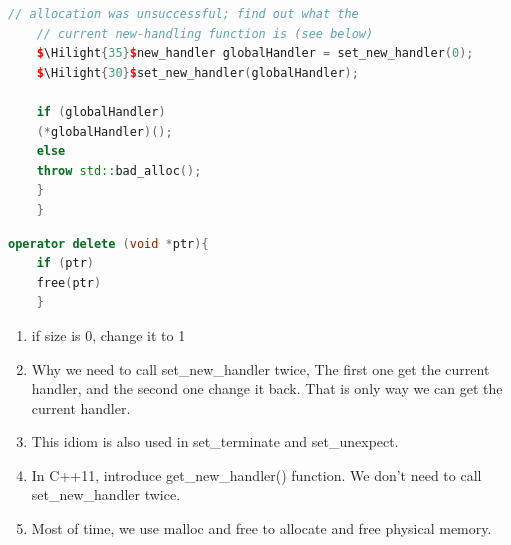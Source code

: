 \documentclass[a4paper,11pt,twoside]{book}
\newcommand{\Hilight}[1]{\makebox[0pt][l]{\color{yellow}\rule[-3pt]{#1em}{11pt}}}
\newcommand{\Hilight}[1]{}
\begin{document}
\begin{itemize}
\begin{lstlisting}[frame=single, language=c++]
	// allocation was unsuccessful; find out what the
	// current new-handling function is (see below)
	$\Hilight{35}$new_handler globalHandler = set_new_handler(0);
	$\Hilight{30}$set_new_handler(globalHandler);
	
	if (globalHandler) 
	(*globalHandler)();
	else 
	throw std::bad_alloc();
	}
	}
	\end{lstlisting}
	
	\begin{lstlisting}[frame=single, language=c++]
	operator delete (void *ptr){
	if (ptr)
	free(ptr)
	}
	\end{lstlisting}
	\begin{enumerate}
		\item if size is 0, change it to 1
		\item Why we need to call set\_new\_handler twice, The first one get the current handler, and the second one change it back. That is only way we can get the current handler.
		
		\item This idiom is also used in set\_terminate and set\_unexpect. 
		
		\item In C++11, introduce get\_new\_handler() function. We don't need to call set\_new\_handler twice. 
		
		\item Most of time, we use malloc and free to allocate and free physical memory.
	\end{enumerate}
\end{itemize}
\end{document}
